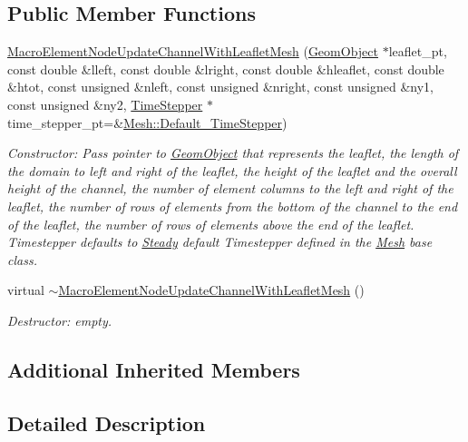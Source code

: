 \subsection*{Public Member Functions}
\begin{DoxyCompactItemize}
\item 
\hyperlink{classoomph_1_1MacroElementNodeUpdateChannelWithLeafletMesh_a8b2ddfc283a8f1ff6927c7a0c7f0ed21}{Macro\+Element\+Node\+Update\+Channel\+With\+Leaflet\+Mesh} (\hyperlink{classoomph_1_1GeomObject}{Geom\+Object} $\ast$leaflet\+\_\+pt, const double \&lleft, const double \&lright, const double \&hleaflet, const double \&htot, const unsigned \&nleft, const unsigned \&nright, const unsigned \&ny1, const unsigned \&ny2, \hyperlink{classoomph_1_1TimeStepper}{Time\+Stepper} $\ast$time\+\_\+stepper\+\_\+pt=\&\hyperlink{classoomph_1_1Mesh_a12243d0fee2b1fcee729ee5a4777ea10}{Mesh\+::\+Default\+\_\+\+Time\+Stepper})
\begin{DoxyCompactList}\small\item\em Constructor\+: Pass pointer to \hyperlink{classoomph_1_1GeomObject}{Geom\+Object} that represents the leaflet, the length of the domain to left and right of the leaflet, the height of the leaflet and the overall height of the channel, the number of element columns to the left and right of the leaflet, the number of rows of elements from the bottom of the channel to the end of the leaflet, the number of rows of elements above the end of the leaflet. Timestepper defaults to \hyperlink{classoomph_1_1Steady}{Steady} default Timestepper defined in the \hyperlink{classoomph_1_1Mesh}{Mesh} base class. \end{DoxyCompactList}\item 
virtual \hyperlink{classoomph_1_1MacroElementNodeUpdateChannelWithLeafletMesh_a5debbfa68133a5ad9bd621b24b2fd086}{$\sim$\+Macro\+Element\+Node\+Update\+Channel\+With\+Leaflet\+Mesh} ()
\begin{DoxyCompactList}\small\item\em Destructor\+: empty. \end{DoxyCompactList}\end{DoxyCompactItemize}
\subsection*{Additional Inherited Members}


\subsection{Detailed Description}
